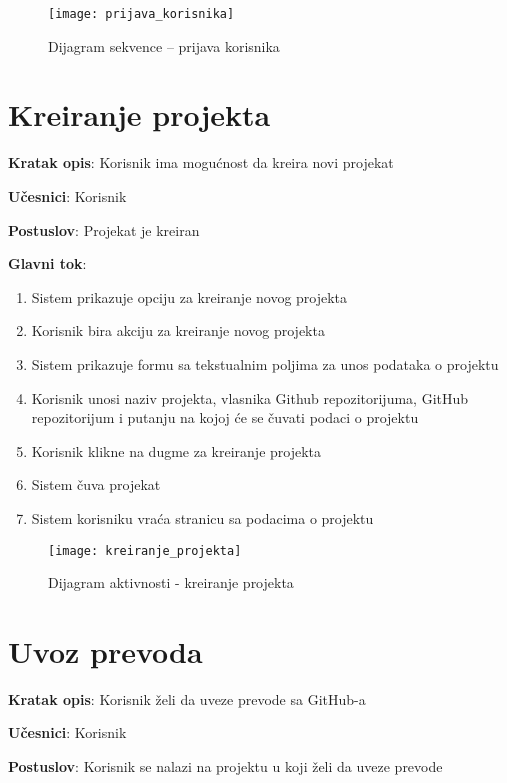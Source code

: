 \begin{figure}[H]
    \centering
    \texttt{[image: prijava\_korisnika]}
    \caption{Dijagram sekvence -- prijava korisnika}
\end{figure}


\section{Kreiranje projekta}

\textbf{Kratak opis}: Korisnik ima mogućnost da kreira novi projekat

\textbf{Učesnici}: Korisnik

\textbf{Postuslov}: Projekat je kreiran

\textbf{Glavni tok}:
\begin{enumerate}
    \item Sistem prikazuje opciju za kreiranje novog projekta
    \item Korisnik bira akciju za kreiranje novog projekta
    \item Sistem prikazuje formu sa tekstualnim poljima za unos podataka o projektu
    \item Korisnik unosi naziv projekta, vlasnika Github repozitorijuma, 
    GitHub repozitorijum i putanju na kojoj će se čuvati podaci o projektu
    \item Korisnik klikne na dugme za kreiranje projekta
    \item Sistem čuva projekat
    \item Sistem korisniku vraća stranicu sa podacima o projektu
\end{enumerate}

\begin{figure}[H]
    \centering
    \texttt{[image: kreiranje\_projekta]}
    \caption{Dijagram aktivnosti - kreiranje projekta}
\end{figure}


\section{Uvoz prevoda}

\textbf{Kratak opis}: Korisnik želi da uveze prevode sa GitHub-a

\textbf{Učesnici}: Korisnik

\textbf{Postuslov}: Korisnik se nalazi na projektu u koji želi da uveze prevode

